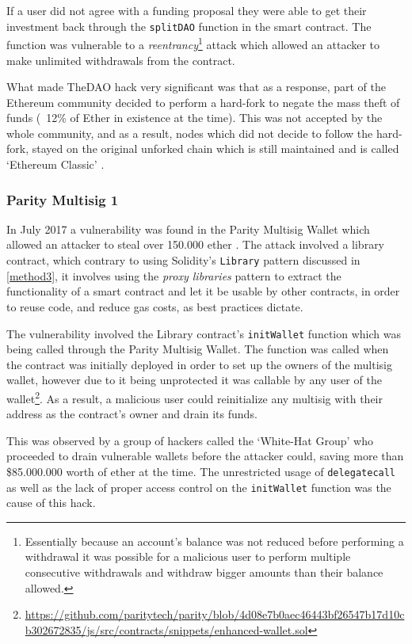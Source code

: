 If a user did not agree with a funding proposal they were able to get their investment back through the \texttt{splitDAO} function in the smart contract. The function was vulnerable to a \textit{reentrancy}\footnote{Essentially because an account's balance was not reduced before performing a withdrawal it was possible for a malicious user to perform multiple consecutive withdrawals and withdraw bigger amounts than their balance allowed.} attack which allowed an attacker to make unlimited withdrawals from the contract\cite{bloombergdao,hackingdistibuteddao}.

What made TheDAO hack very significant was that as a response, part of the Ethereum community decided to perform a hard-fork to negate the mass theft of funds (~12\% of Ether in existence at the time). This was not accepted by the whole community, and as a result, nodes which did not decide to follow the hard-fork, stayed on the original unforked chain which is still maintained and is called `Ethereum Classic' \cite{etc}. 

\subsubsection{Parity Multisig 1}
In July 2017 a vulnerability was found in the Parity Multisig Wallet which allowed an attacker to steal over 150.000 ether \cite{parityhack}. The attack involved a library contract, which contrary to using Solidity's \texttt{Library} pattern discussed in \ref{method3}, it involves using the \textit{proxy libraries} pattern \cite{proxylibraries} to extract the functionality of a smart contract and let it be usable by other contracts, in order to reuse code, and reduce gas costs, as best practices dictate.

The vulnerability involved the Library contract's \texttt{initWallet} function which was being called through the Parity Multisig Wallet. The function was called when the contract was initially deployed in order to set up the owners of the multisig wallet, however due to it being unprotected it was callable by any user of the wallet\footnote{\url{https://github.com/paritytech/parity/blob/4d08e7b0aec46443bf26547b17d10cb302672835/js/src/contracts/snippets/enhanced-wallet.sol}}. As a result, a malicious user could reinitialize any multisig with their address as the contract's owner and drain its funds.

This was observed by a group of hackers called the `White-Hat Group' who proceeded to drain vulnerable wallets before the attacker could, saving more than \$85.000.000 worth of ether at the time. The unrestricted usage of \texttt{delegatecall} as well as the lack of proper access control on the \texttt{initWallet} function was the cause of this hack. 

